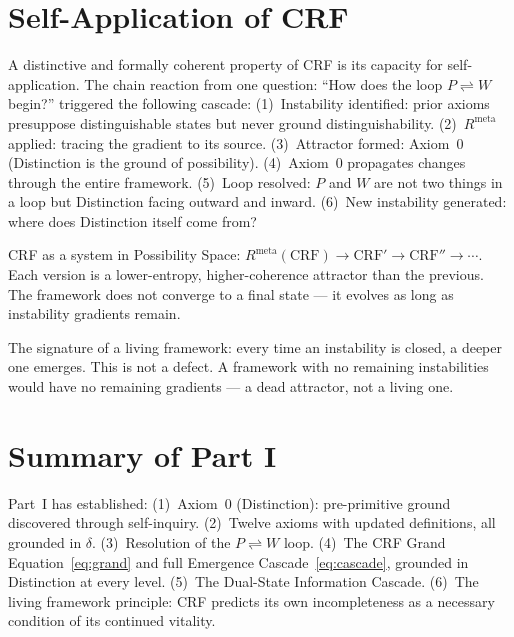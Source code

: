 \documentclass[12pt, a4paper]{article}
\begin{document}
\section{Self-Application of CRF}

A distinctive and formally coherent property of CRF is its capacity for self-application.
The chain reaction from one question: ``How does the loop $P \rightleftharpoons W$ begin?''
triggered the following cascade:
(1)~Instability identified: prior axioms presuppose distinguishable states but never ground
distinguishability.
(2)~$R^{\mathrm{meta}}$ applied: tracing the gradient to its source.
(3)~Attractor formed: Axiom~0 (Distinction is the ground of possibility).
(4)~Axiom~0 propagates changes through the entire framework.
(5)~Loop resolved: $P$ and $W$ are not two things in a loop but Distinction facing
outward and inward.
(6)~New instability generated: where does Distinction itself come from?

CRF as a system in Possibility Space: $R^{\mathrm{meta}}(\mathrm{CRF}) \to
\mathrm{CRF}' \to \mathrm{CRF}'' \to \cdots$. Each version is a lower-entropy,
higher-coherence attractor than the previous. The framework does not converge to a
final state --- it evolves as long as instability gradients remain.

The signature of a living framework: every time an instability is closed, a deeper one
emerges. This is not a defect. A framework with no remaining instabilities would have no
remaining gradients --- a dead attractor, not a living one.

\section{Summary of Part I}

Part~I has established: (1)~Axiom~0 (Distinction): pre-primitive ground discovered
through self-inquiry. (2)~Twelve axioms with updated definitions, all grounded in $\delta$.
(3)~Resolution of the $P \rightleftharpoons W$ loop. (4)~The CRF Grand Equation~\eqref{eq:grand}
and full Emergence Cascade~\eqref{eq:cascade}, grounded in Distinction at every level.
(5)~The Dual-State Information Cascade. (6)~The living framework principle: CRF predicts
its own incompleteness as a necessary condition of its continued vitality.
\end{document}
